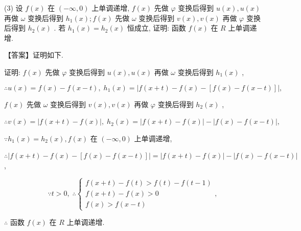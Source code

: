 \documentclass[10pt]{article}
\begin{document}
(3) 设 \(f\left( x\right)\) 在 \(\left( {-\infty ,0}\right)\) 上单调递增, \(f\left( x\right)\) 先做 \(\varphi\) 变换后得到 \(u\left( x\right) ,u\left( x\right)\) 再做 \(\omega\) 变换后得到 \({h}_{1}\left( x\right) ;f\left( x\right)\) 先做 \(\omega\) 变换后得到 \(v\left( x\right) ,v\left( x\right)\) 再做 \(\varphi\) 变换后得到 \({h}_{2}\left( x\right)\) . 若 \({h}_{1}\left( x\right)  = {h}_{2}\left( x\right)\) 恒成立, 证明: 函数 \(f\left( x\right)\) 在 \(R\) 上单调递增.

【答案】证明如下.

证明: \(f\left( x\right)\) 先做 \(\varphi\) 变换后得到 \(u\left( x\right) ,u\left( x\right)\) 再做 \(\omega\) 变换后得到 \({h}_{1}\left( x\right)\) ,

\[
\therefore u\left( x\right)  = f\left( x\right)  - f\left( {x - t}\right) ,\;{h}_{1}\left( x\right)  = \left| {f\left( {x + t}\right)  - f\left( x\right)  - \left\lbrack  {f\left( x\right)  - f\left( {x - t}\right) }\right\rbrack  }\right| ,
\]

\(f\left( x\right)\) 先做 \(\omega\) 变换后得到 \(v\left( x\right) ,v\left( x\right)\) 再做 \(\varphi\) 变换后得到 \({h}_{2}\left( x\right)\) ,

\(\therefore v\left( x\right)  = \left| {f\left( {x + t}\right)  - f\left( x\right) }\right| ,\;{h}_{2}\left( x\right)  = \left| {f\left( {x + t}\right)  - f\left( x\right) }\right|  - \left| {f\left( x\right)  - f\left( {x - t}\right) }\right| ,\)

\(\because {h}_{1}\left( x\right)  = {h}_{2}\left( x\right) ,f\left( x\right)\) 在 \(\left( {-\infty ,0}\right)\) 上单调递增,

\(\therefore \left| {f\left( {x + t}\right)  - f\left( x\right)  - \left\lbrack  {f\left( x\right)  - f\left( {x - t}\right) }\right\rbrack  }\right|  = \left| {f\left( {x + t}\right)  - f\left( x\right) }\right|  - \left| {f\left( x\right)  - f\left( {x - t}\right) }\right|\) ,

\[
\because t > 0,\;\therefore \left\{  {\begin{array}{l} f\left( {x + t}\right)  - f\left( t\right)  > f\left( t\right)  - f\left( {t - 1}\right) \\  f\left( {x + t}\right)  - f\left( x\right)  > 0 \\  f\left( x\right)  > f\left( {x - t}\right)  \end{array},}\right.
\]

\(\therefore\) 函数 \(f\left( x\right)\) 在 \(R\) 上单调递增.
\end{document}
